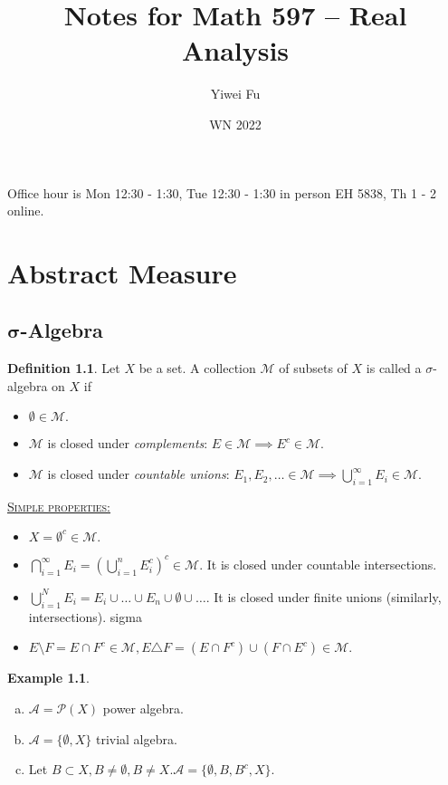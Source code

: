 \documentclass{report}
\newcommand{\fancyem}[1]{\underline{\textsc{#1}}}
\theoremstyle{definition}
\newtheorem{definition}[theorem]{Definition}
\newtheorem{example}[theorem]{Example}
\theoremstyle{remark}
\newcommand*\ttlmath[2]{\texorpdfstring{$\boldsymbol{#1}$}{#2}}
\begin{document}
\clearpage
\thispagestyle{empty}
\title{Notes for Math 597 -- Real Analysis}
\author{Yiwei Fu}
\date{WN 2022}
\maketitle

\tableofcontents
Office hour is Mon 12:30 - 1:30, Tue 12:30 - 1:30 in person EH 5838, Th 1 - 2 online.

\clearpage
{}
\chapter{Abstract Measure}

\section{\ttlmath{\sigma}{sigma}-Algebra}
\begin{definition}
Let $X$ be a set. A collection $\mathcal{M}$ of subsets of $X$ is called a $\sigma$-algebra on $X$ if
\begin{itemize}
\item
	$\emptyset \in \mathcal{M}.$
\item
	$\mathcal{M}$ is closed under \emph{complements}: $E \in \mathcal{M} \implies E^c \in \mathcal{M}.$
\item
	$\mathcal{M}$ is closed under \emph{countable unions}: $E_1, E_2, \ldots \in \mathcal{M} \implies \bigcup_{i=1}^\infty E_i \in \mathcal{M}.$
\end{itemize}
\end{definition}
\fancyem{Simple properties:}
\begin{itemize}
\item
	$X = \emptyset^c \in \mathcal{M}.$
\item
	$\bigcap_{i=1}^\infty E_i = \left(\bigcup_{i=1}^n E_i^c\right)^c \in \mathcal{M}.$ It is closed under countable intersections.
\item
	$\bigcup_{i=1}^N E_i = E_i \cup \ldots \cup E_n \cup \emptyset \cup \ldots.$ It is closed under finite unions (similarly, intersections).
sigma\item
	$E \setminus F = E \cap F^c \in \mathcal{M}, E \triangle F = (E \cap F^c) \cup (F \cap E^c) \in \mathcal{M}.$
\end{itemize}

\begin{example}
\begin{enumerate}[(a)]
\item $\mathcal{A} = \mathcal{P}(X)$ power algebra.
\item $\mathcal{A} = \{\emptyset, X\}$ trivial algebra.
\item Let $B \subset X, B \neq \emptyset, B \neq X. \mathcal{A} = \{\emptyset, B, B^c, X\}.$
\end{enumerate}
\end{example}
\end{document}
